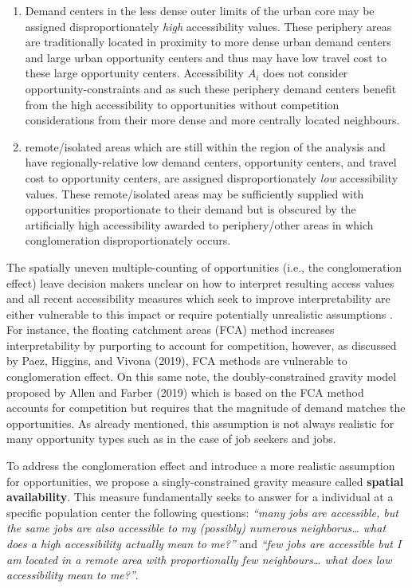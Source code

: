 \documentclass[]{elsarticle} %
\begin{document}
\begin{enumerate}
\def\labelenumi{\arabic{enumi})}
\item
  Demand centers in the less dense outer limits of the urban core may be
  assigned disproportionately \emph{high} accessibility values. These
  periphery areas are traditionally located in proximity to more dense
  urban demand centers and large urban opportunity centers and thus may
  have low travel cost to these large opportunity centers. Accessibility
  \(A_i\) does not consider opportunity-constraints and as such these
  periphery demand centers benefit from the high accessibility to
  opportunities without competition considerations from their more dense
  and more centrally located neighbours.
\item
  remote/isolated areas which are still within the region of the
  analysis and have regionally-relative low demand centers, opportunity
  centers, and travel cost to opportunity centers, are assigned
  disproportionately \emph{low} accessibility values. These
  remote/isolated areas may be sufficiently supplied with opportunities
  proportionate to their demand but is obscured by the artificially high
  accessibility awarded to periphery/other areas in which conglomeration
  disproportionately occurs.
\end{enumerate}

The spatially uneven multiple-counting of opportunities (i.e., the
conglomeration effect) leave decision makers unclear on how to interpret
resulting access values and all recent accessibility measures which seek
to improve interpretability are either vulnerable to this impact or
require potentially unrealistic assumptions . For instance, the floating
catchment areas (FCA) method increases interpretability by purporting to
account for competition, however, as discussed by Paez, Higgins, and
Vivona (2019), FCA methods are vulnerable to conglomeration effect. On
this same note, the doubly-constrained gravity model proposed by Allen
and Farber (2019) which is based on the FCA method accounts for
competition but requires that the magnitude of demand matches the
opportunities. As already mentioned, this assumption is not always
realistic for many opportunity types such as in the case of job seekers
and jobs.

To address the conglomeration effect and introduce a more realistic
assumption for opportunities, we propose a singly-constrained gravity
measure called \textbf{spatial availability}. This measure fundamentally
seeks to answer for a individual at a specific population center the
following questions: \emph{``many jobs are accessible, but the same jobs
are also accessible to my (possibly) numerous neighborus\ldots{} what
does a high accessibility actually mean to me?''} and \emph{``few jobs
are accessible but I am located in a remote area with proportionally few
neighbours\ldots{} what does low accessibility mean to me?''}.
\end{document}
